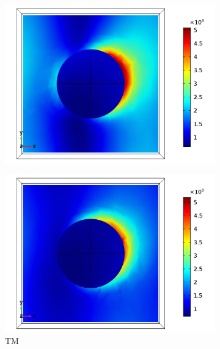 \begin{figure}[htb!]
    \begin{subfigure}{0.32\textwidth}
        \centering
        \includegraphics[width=\linewidth]{figures/ch4/S5A/FieldDistribution/phi25/z2/Sample5A_TM_Slice@z=+05Rz_wl=350_phi=25.png}
   \end{subfigure}
   \begin{subfigure}{0.32\textwidth}
        \centering
        \includegraphics[width=\linewidth]{figures/ch4/S5A/FieldDistribution/phi25/z2/Sample5A_TM_Slice@z=+05Rz_wl=400_phi=25.png}
        \caption{TM}
        \vspace{-0.7cm}
   \end{subfigure}
   \begin{subfigure}{0.32\textwidth}

\end{subfigure}
\end{figure}
